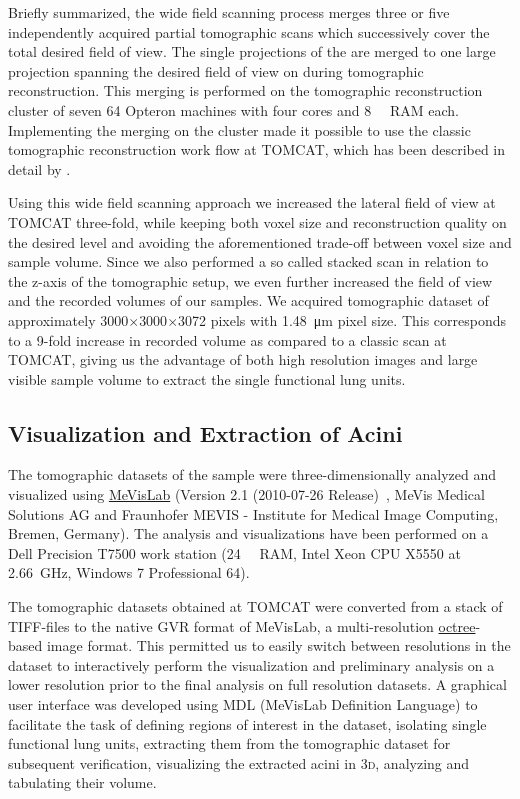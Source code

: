 \documentclass[%
	paper=a4,%
	abstract=true,%
	]{scrartcl}
\newcommand{\threed}{3\textsc{d}\xspace}
\begin{document}
Briefly summarized, the wide field scanning process merges three or five independently acquired partial tomographic scans which successively cover the total desired field of view. The single projections of the are merged to one large projection spanning the desired field of view on during tomographic reconstruction. This merging is performed on the tomographic reconstruction cluster of seven \SI{64}{\bit} Opteron machines with four cores and \SI{8}{\giga\byte} RAM each. Implementing the merging on the cluster made it possible to use the classic tomographic reconstruction work flow at TOMCAT, which has been described in detail by \citet{Hintermueller2010}.

Using this wide field scanning approach we increased the lateral field of view at TOMCAT three-fold, while keeping both voxel size and reconstruction quality on the desired level and avoiding the aforementioned trade-off between voxel size and sample volume. Since we also performed a so called stacked scan in relation to the z-axis of the tomographic setup, we even further increased the field of view and the recorded volumes of our samples. We acquired tomographic dataset of approximately 3000\(\times\)3000\(\times\)3072 pixels with \SI{1.48}{\micro\meter} pixel size. This corresponds to a 9-fold increase in recorded volume as compared to a classic scan at TOMCAT, giving us the advantage of both high resolution images and large visible sample volume to extract the single functional lung units.

\subsection{Visualization and Extraction of Acini}
The tomographic datasets of the sample were three-dimensionally analyzed and visualized using \href{http://mevislab.de}{MeVisLab} (Version 2.1 (2010-07-26 Release)~\cite{Bitter2007}, MeVis Medical Solutions AG and Fraunhofer MEVIS - Institute for Medical Image Computing, Bremen, Germany). The analysis and visualizations have been performed on a Dell Precision T7500 work station (\SI{24}{\giga\byte} RAM, Intel Xeon CPU X5550 at \SI{2.66}{\giga\hertz}, Windows 7 Professional \SI{64}{\bit}). 

The tomographic datasets obtained at TOMCAT were converted from a stack of TIFF-files to the native GVR format of MeVisLab, a multi-resolution \href{https://secure.wikimedia.org/wikipedia/en/w/index.php?title=Octree&oldid=409131920}{octree}-based image format. This permitted us to easily switch between resolutions in the dataset to interactively perform the visualization and preliminary analysis on a lower resolution prior to the final analysis on full resolution datasets. A graphical user interface was developed using MDL (MeVisLab Definition Language) to facilitate the task of defining regions of interest in the dataset, isolating single functional lung units, extracting them from the tomographic dataset for subsequent verification, visualizing the extracted acini in \threed, analyzing and tabulating their volume.
\end{document}
